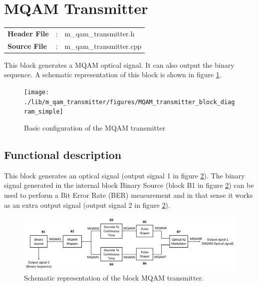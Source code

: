 \clearpage

\section{MQAM Transmitter}

\begin{tcolorbox}	
	\begin{tabular}{p{2.75cm} p{0.2cm} p{10.5cm}} 	
		\textbf{Header File}   &:& m\_qam\_transmitter.h \\
		\textbf{Source File}   &:& m\_qam\_transmitter.cpp \\
	\end{tabular}
\end{tcolorbox}

This block generates a MQAM optical signal. It can also output the binary sequence. A schematic representation of this block is shown in figure \ref{MQAM_transmitter_block_diagram_simple}.

\begin{figure}[h]
	\centering
	\texttt{[image: ./lib/m\_qam\_transmitter/figures/MQAM\_transmitter\_block\_diagram\_simple]}
	\caption{Basic configuration of the MQAM transmitter}\label{MQAM_transmitter_block_diagram_simple}
\end{figure}

\subsection*{Functional description}

This block generates an optical signal (output signal 1 in figure \ref{MQAM_transmitter_block_diagram}). The binary signal generated in the internal block Binary Source (block B1 in figure \ref{MQAM_transmitter_block_diagram}) can be used to perform a Bit Error Rate (BER) measurement and in that sense it works as an extra output signal (output signal 2 in figure \ref{MQAM_transmitter_block_diagram}).

\begin{figure}[h]
	\centering
	\includegraphics[width=\textwidth]{./lib/m_qam_transmitter/figures/MQAM_transmitter_block_diagram}
	\caption{Schematic representation of the block MQAM transmitter.}\label{MQAM_transmitter_block_diagram}
\end{figure}

